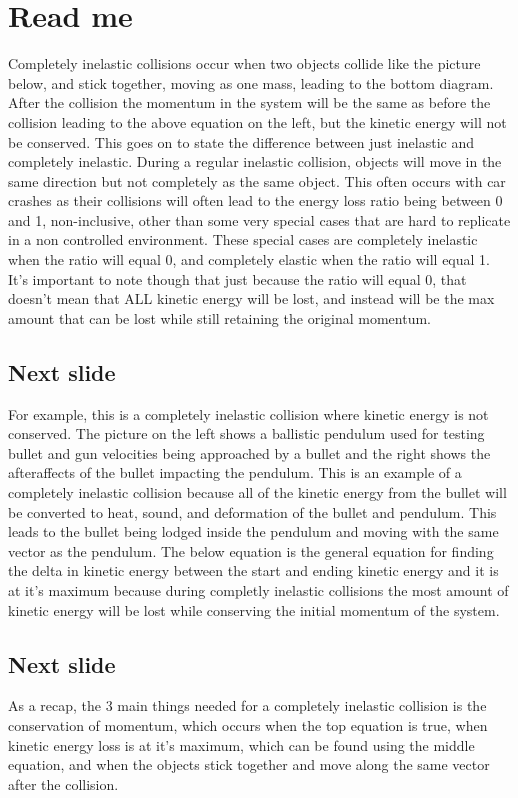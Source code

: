 \documentclass{report}
\begin{document}
\section{Read me}%
\label{sec:Read me}

Completely inelastic collisions occur when two objects collide like the picture below, and stick together, moving as one mass, leading to the bottom diagram. After the collision the momentum in the system will be the same as before the collision leading to the above equation on the left, but the kinetic energy will not be conserved. This goes on to state the difference between just inelastic and completely inelastic. During a regular inelastic collision, objects will move in the same direction but not completely as the same object. This often occurs with car crashes as their collisions will often lead to the energy loss ratio being between 0 and 1, non-inclusive, other than some very special cases that are hard to replicate in a non controlled environment. These special cases are completely inelastic when the ratio will equal 0, and completely elastic when the ratio will equal 1. It's important to note though that just because the ratio will equal 0, that doesn't mean that ALL kinetic energy will be lost, and instead will be the max amount that can be lost while still retaining the original momentum. 

\subsection{Next slide}%
\label{sub:Next slide}
For example, this is a completely inelastic collision where kinetic energy is not conserved. The picture on the left shows a ballistic pendulum used for testing bullet and gun velocities being approached by a bullet and the right shows the afteraffects of the bullet impacting the pendulum. This is an example of a completely inelastic collision because all of the kinetic energy from the bullet will be converted to heat, sound, and deformation of the bullet and pendulum. This leads to the bullet being lodged inside the pendulum and moving with the same vector as the pendulum. The below equation is the general equation for finding the delta in kinetic energy between the start and ending kinetic energy and it is at it's maximum because during completly inelastic collisions the most amount of kinetic energy will be lost while conserving the initial momentum of the system. 
\subsection{Next slide}%
\label{sub:Next slide}
As a recap, the 3 main things needed for a completely inelastic collision is the conservation of momentum, which occurs when the top equation is true, when kinetic energy loss is at it's maximum, which can be found using the middle equation, and when the objects stick together and move along the same vector after the collision.
\end{document}
